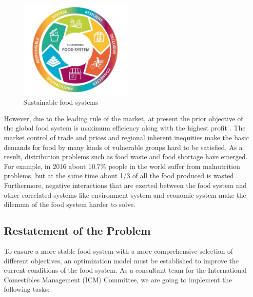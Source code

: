 \documentclass[12pt]{article}
\begin{document}
\vspace{-1em}
\begin{figure}[H]
    \centering
    \includegraphics[width = 0.5\textwidth]{figure/FS.pdf}
    \vspace{-1em}
    \caption {Sustainable food systems \cite{cite:fig}}
\end{figure}

\vspace{-1em}
However, due to the leading rule of the market, at present the prior objective of the global food system is maximum efficiency along with the highest profit \cite{cite:Market}. The market control of trade and prices and regional inherent inequities make the basic demands for food by many kinds of vulnerable groups hard to be satisfied. As a result, distribution problems such as food waste and food shortage have emerged. For example, in 2016 about 10.7\% people in the world suffer from malnutrition problems, but at the same time about 1/3 of all the food produced is wasted \cite{cite:USDA}. Furthermore, negative interactions that are exerted between the food system and other correlated systems like environment system and economic system make the dilemma of the food system harder to solve. 

\vspace{-1em}
\subsection{Restatement of the Problem}

To ensure a more stable food system with a more comprehensive selection of different objectives, an optimization model must be established to improve the current conditions of the food system. As a consultant team for the International Comestibles Management (ICM) Committee, we are going to implement the following tasks:
\end{document}

